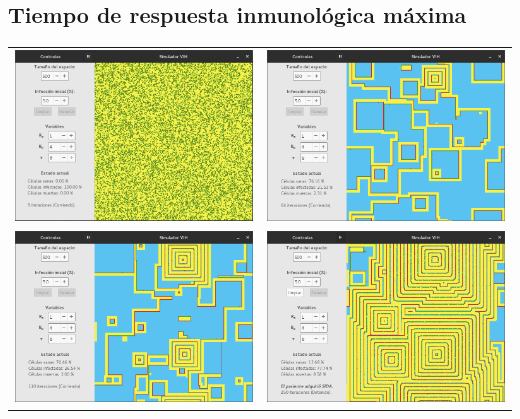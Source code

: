 \documentclass[12pt,letterpaper,oneside]{report}
\begin{document}
	\subsection{Tiempo de respuesta inmunológica máxima} %
	\label{sub:tiempo_de_respuesta_inmunol_gica_m_xima}
	\begin{center}
		\begin{tabular}{c c}
		\includegraphics[width=8cm]{img/tiempo/max/1.png} & \includegraphics[width=8cm]{img/tiempo/max/2.png} \\
		\includegraphics[width=8cm]{img/tiempo/max/3.png} & \includegraphics[width=8cm]{img/tiempo/max/4.png} \\
		\end{tabular}
	\end{center}
\end{document}
